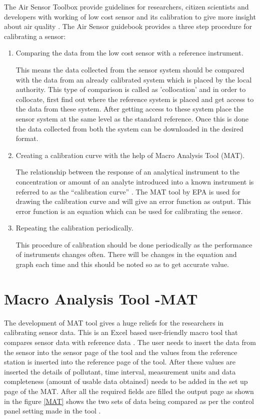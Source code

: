 \documentclass[12pt,a4paper,oneside]{report}
\begin{document}
The Air Sensor Toolbox provide guidelines for researchers, citizen scientists and developers with working of low cost sensor and its calibration to give more insight about air quality \cite{airsensortoolbox}. The Air Sensor guidebook\cite{airsensorguidebook} provides a three step procedure for calibrating a sensor:
\begin{enumerate}
    \item Comparing the data from the low cost sensor with a reference instrument.
    
This means the data collected from the sensor system should be compared with the data from an already calibrated system which is placed by the local authority. This type of comparison is called as 'collocation' and in order to collocate, first find out where the reference system is placed and get access to the data from these system. After getting access to these system place the sensor system at the same level as the standard reference. Once this is done the data collected from both the system can be downloaded in the desired format.

    \item Creating a calibration curve with the help of Macro Analysis Tool (MAT).

The relationship between the response of an analytical instrument to the concentration or amount of an analyte introduced into a known instrument is referred to as the “calibration curve” \cite{Epa2010}. The MAT tool by EPA is used for drawing the calibration curve and will give an error function as output. This error function is an equation which can be used for calibrating the sensor.
    \item Repeating the calibration periodically.

    This procedure of calibration should be done periodically as the performance of instruments changes often. There will be changes in the equation and graph each time and this should be noted so as to get accurate value.
\end{enumerate} 

\section*{Macro Analysis Tool -MAT}
The development of MAT tool gives a huge reliefs for the researchers in calibrating sensor data. This is an Excel based user-friendly macro tool that compares sensor data with reference data \cite{National2017}. The user needs to insert the data from the sensor into the sensor page of the tool and the values from the reference station is inserted into the reference page of the tool. After these values are inserted the details of pollutant, time interval, measurement units and data completeness (amount of usable data obtained) needs to be added in the set up page of the MAT. After all the required fields are filled the output page as shown in the figure \ref{MAT} shows the two sets of data being compared as per the control panel setting made in the tool \cite{National2017}. 
\end{document}
